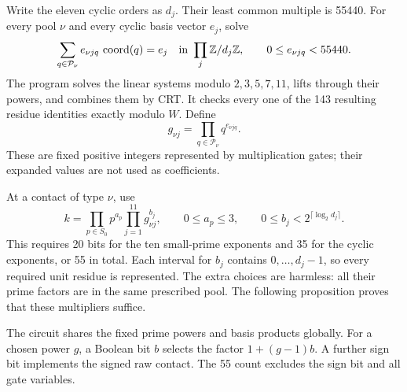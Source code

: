 \documentclass[11pt]{article}
\theoremstyle{definition}
\begin{document}
Write the eleven cyclic orders as \(d_j\). Their least common
multiple is 55440. For every
pool \(\nu\) and every cyclic basis vector \(e_j\), solve
\[
 \sum_{q\in\mathcal P_\nu}e_{\nu jq}\,\operatorname{coord}(q)
       =e_j\quad\hbox{in }\prod_j\mathbb Z/d_j\mathbb Z,
       \qquad 0\le e_{\nu jq}<55440.
\]
The program solves the linear systems modulo \(2,3,5,7,11\), lifts
through their powers, and combines them by CRT. It checks every one of
the 143 resulting residue identities exactly modulo \(W\). Define
\[
             g_{\nu j}=\prod_{q\in\mathcal P_\nu}q^{e_{\nu jq}}.
\]
These are fixed positive integers represented by multiplication gates;
their expanded values are not used as coefficients.

At a contact of type \(\nu\), use
\begin{equation}\label{eq:cyclic-multiplier}
 k=\prod_{p\in S_0}p^{a_p}\prod_{j=1}^{11}g_{\nu j}^{b_j},
 \qquad 0\le a_p\le3,\qquad
 0\le b_j<2^{\lceil\log_2d_j\rceil}.
\end{equation}
This requires 20 bits for the ten small-prime exponents and 35 for
the cyclic exponents, or 55 in total. Each interval for \(b_j\)
contains \(0,\ldots,d_j-1\), so every required unit residue is
represented. The extra choices are harmless: all their prime factors
are in the same prescribed pool. The following proposition proves that these multipliers suffice.

The circuit shares the fixed prime powers and basis products globally.
For a chosen power \(g\), a Boolean bit \(b\) selects the factor
\(1+(g-1)b\). A further sign bit implements the signed raw contact.
The 55 count excludes the sign bit and all gate variables.
\end{document}

